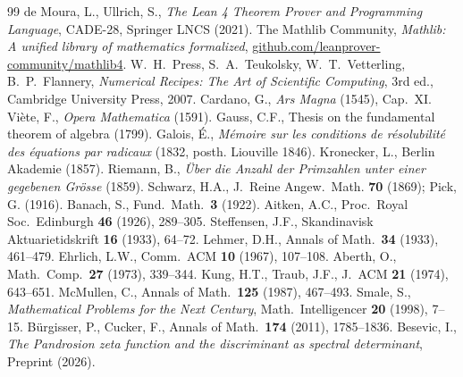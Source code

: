 \documentclass[11pt,a4paper]{article}
\theoremstyle{definition}
\theoremstyle{remark}
\begin{document}
\begin{thebibliography}{99}
 de Moura, L., Ullrich, S., \emph{The Lean 4 Theorem Prover and Programming Language}, CADE-28, Springer LNCS (2021).
 The Mathlib Community, \emph{Mathlib: A unified library of mathematics formalized}, \url{github.com/leanprover-community/mathlib4}.
 W.~H.~Press, S.~A.~Teukolsky, W.~T.~Vetterling, B.~P.~Flannery, \emph{Numerical Recipes: The Art of Scientific Computing}, 3rd ed., Cambridge University Press, 2007.
 Cardano, G., \emph{Ars Magna} (1545), Cap.~XI.
 Viète, F., \emph{Opera Mathematica} (1591).
 Gauss, C.F., Thesis on the fundamental theorem of algebra (1799).
 Galois, É., \emph{Mémoire sur les conditions de résolubilité des équations par radicaux} (1832, posth. Liouville 1846).
 Kronecker, L., Berlin Akademie (1857).
 Riemann, B., \emph{Über die Anzahl der Primzahlen unter einer gegebenen Grösse} (1859).
 Schwarz, H.A., J.~Reine Angew.~Math. \textbf{70} (1869); Pick, G. (1916).
 Banach, S., Fund.~Math.~\textbf{3} (1922).
 Aitken, A.C., Proc.~Royal Soc.~Edinburgh \textbf{46} (1926), 289--305.
 Steffensen, J.F., Skandinavisk Aktuarietidskrift \textbf{16} (1933), 64--72.
 Lehmer, D.H., Annals of Math.~\textbf{34} (1933), 461--479.
 Ehrlich, L.W., Comm.~ACM \textbf{10} (1967), 107--108.
 Aberth, O., Math.~Comp.~\textbf{27} (1973), 339--344.
 Kung, H.T., Traub, J.F., J.~ACM \textbf{21} (1974), 643--651.
 McMullen, C., Annals of Math.~\textbf{125} (1987), 467--493.
 Smale, S., \emph{Mathematical Problems for the Next Century}, Math.~Intelligencer \textbf{20} (1998), 7--15.
 Bürgisser, P., Cucker, F., Annals of Math.~\textbf{174} (2011), 1785--1836.
 Besevic, I., \emph{The Pandrosion zeta function and the discriminant as spectral determinant}, Preprint (2026).
\end{thebibliography}
\end{document}
